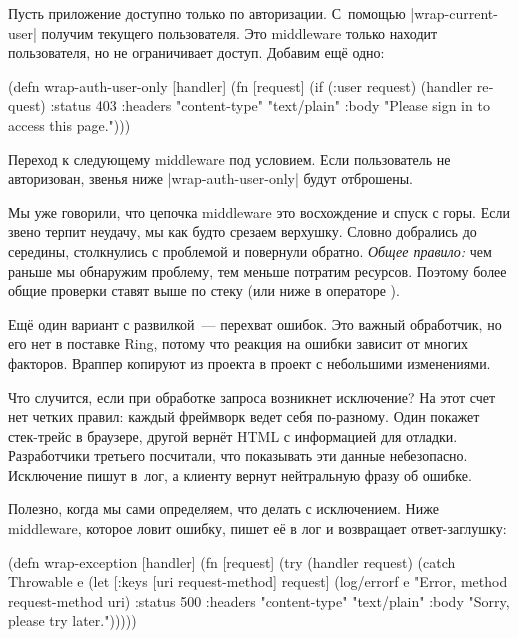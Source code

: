 Пусть приложение доступно только по авторизации. С~помощью
\spverb|wrap-current-user| получим текущего пользователя. Это middleware только
находит пользователя, но не ограничивает доступ. Добавим ещ\"{е} одно:

\begin{english}
  \begin{clojure}
(defn wrap-auth-user-only [handler]
  (fn [request]
    (if (:user request)
      (handler request)
      {:status 403
       :headers {"content-type" "text/plain"}
       :body "Please sign in to access this page."})))
  \end{clojure}
\end{english}

Переход к следующему middleware под условием. Если пользователь не
авторизован, звенья ниже \spverb|wrap-auth-user-only| будут отброшены.

Мы уже говорили, что цепочка middleware это восхождение и спуск с горы. Если
звено терпит неудачу, мы как будто срезаем верхушку. Словно добрались до
середины, столкнулись с проблемой и повернули обратно. \emph{Общее правило:} чем
раньше мы обнаружим проблему, тем меньше потратим ресурсов. Поэтому более общие
проверки ставят выше по стеку (или ниже в операторе \arr).

Ещ\"{е} один вариант с развилкой~--- перехват ошибок. Это важный обработчик, но его
нет в поставке Ring, потому что реакция на ошибки зависит от многих
факторов. Враппер копируют из проекта в проект с небольшими изменениями.

Что случится, если при обработке запроса возникнет исключение? На этот счет нет
четких правил: каждый фреймворк ведет себя по-разному. Один покажет стек-трейс в
браузере, другой верн\"{е}т HTML с информацией для отладки. Разработчики третьего
посчитали, что показывать эти данные небезопасно. Исключение пишут в~лог, а
клиенту вернут нейтральную фразу об ошибке.

Полезно, когда мы сами определяем, что делать с исключением. Ниже middleware,
которое ловит ошибку, пишет е\"{е} в лог и возвращает ответ-заглушку:

\begin{english}
  \begin{clojure}
(defn wrap-exception [handler]
  (fn [request]
    (try
      (handler request)
      (catch Throwable e
        (let [{:keys [uri
                      request-method]} request]
          (log/errorf e "Error, method %
                      request-method uri)
          {:status 500
           :headers {"content-type" "text/plain"}
           :body "Sorry, please try later."})))))
  \end{clojure}
\end{english}

